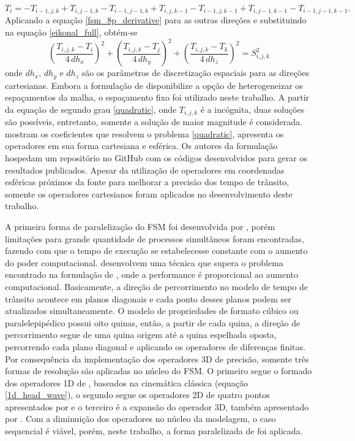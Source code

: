 \begin{equation}
	T_i = - T_{i-1,j,k} + T_{i,j-1,k} - T_{i-1,j-1,k} + T_{i,j,k-1} - T_{i-1,j,k-1} + T_{i,j-1,k-1} - T_{i-1,j-1,k-1}.
\end{equation} 
\noindent Aplicando a equação \ref{fsm_8p_derivative} para as outras direções e substituindo na equação \ref{eikonal_full}, obtém-se
\begin{equation}
	\left(\dfrac{T_{i,j,k} - T_i}{4\,dh_x}\right)^2 + \left(\dfrac{T_{i,j,k} - T_j}{4\,dh_y}\right)^2 + \left(\dfrac{T_{i,j,k} - T_k}{4\,dh_z}\right)^2 = S^2_{i,j,k}
	\label{quadratic}
\end{equation}
\noindent onde $dh_x$, $dh_y$ e $dh_z$ são os parâmetros de discretização espaciais para as direções cartesianas. Embora a formulação de  disponibilize a opção de heterogeneizar os espaçamentos da malha, o espaçamento fixo foi utilizado neste trabalho. A partir da equação de segundo grau \ref{quadratic}, onde $T_{i,j,k}$ é a incógnita, duas soluções são possíveis, entretanto, somente a solução de maior magnitude é considerada.  mostram os coeficientes que resolvem o problema \ref{quadratic}, apresenta os operadores em sua forma cartesiana e esférica. Os autores da formulação hospedam um repositório no GitHub com os códigos desenvolvidos para gerar os resultados publicados. Apesar da utilização de operadores em coordenadas esféricas próximos da fonte para melhorar a precisão dos tempo de trânsito, somente os operadores cartesianos foram aplicados no desenvolvimento deste trabalho.        

A primeira forma de paralelização do FSM foi desenvolvida por , porém limitações para grande quantidade de processos simultâneos foram encontradas, fazendo com que o tempo de execução se estabelecesse constante com o aumento do poder computacional.  desenvolvem uma técnica que supera o problema encontrado na formulação de , onde a performance é proporcional ao aumento computacional. Basicamente, a direção de percorrimento no modelo de tempo de trânsito acontece em planos diagonais e cada ponto desses planos podem ser atualizados simultaneamente. O modelo de propriedades de formato cúbico ou paralelepipédico possui oito quinas, então, a partir de cada quina, a direção de percorrimento segue de uma quina origem até a quina espelhada oposta, percorrendo cada plano diagonal e aplicando os operadores de diferenças finitas. Por consequência da implementação dos operadores 3D de precisão, somente três formas de resolução são aplicadas no núcleo do FSM. O primeiro segue o formado dos operadores 1D de , baseados na cinemática clássica (equação \ref{1d_head_wave}), o segundo segue os operadores 2D de quatro pontos apresentados por  e o terceiro é a expansão do operador 3D, também apresentado por . Com a diminuição dos operadores no núcleo da modelagem, o caso sequencial é viável, porém, neste trabalho, a forma paralelizada de  foi aplicada.  

